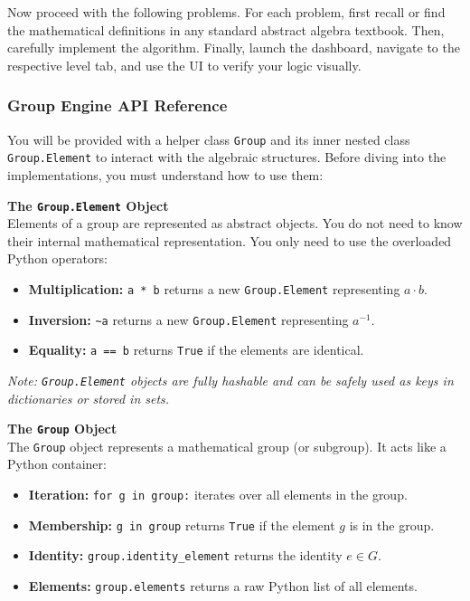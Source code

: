 \documentclass[11pt]{article}
\begin{document}
\vspace{0.5cm}
\noindent Now proceed with the following problems. For each problem, first recall or find the mathematical definitions in any standard abstract algebra textbook. Then, carefully implement the algorithm. Finally, launch the dashboard, navigate to the respective level tab, and use the UI to verify your logic visually.

\subsubsection*{Group Engine API Reference}
You will be provided with a helper class \lstinline|Group| and its inner nested class \lstinline|Group.Element| to interact with the algebraic structures. Before diving into the implementations, you must understand how to use them:

\textbf{The \lstinline|Group.Element| Object}\\
Elements of a group are represented as abstract objects. You do not need to know their internal mathematical representation. You only need to use the overloaded Python operators:
\begin{itemize}
    \item \textbf{Multiplication:} \lstinline|a * b| returns a new \lstinline|Group.Element| representing $a \cdot b$.
    \item \textbf{Inversion:} \lstinline|~a| returns a new \lstinline|Group.Element| representing $a^{-1}$.
    \item \textbf{Equality:} \lstinline|a == b| returns \lstinline|True| if the elements are identical.
\end{itemize}
\textit{Note: \lstinline|Group.Element| objects are fully hashable and can be safely used as keys in dictionaries or stored in sets.}

\textbf{The \lstinline|Group| Object}\\
The \lstinline|Group| object represents a mathematical group (or subgroup). It acts like a Python container:
\begin{itemize}
    \item \textbf{Iteration:} \lstinline|for g in group:| iterates over all elements in the group.
    \item \textbf{Membership:} \lstinline|g in group| returns \lstinline|True| if the element $g$ is in the group.
    \item \textbf{Identity:} \lstinline|group.identity_element| returns the identity $e \in G$.
    \item \textbf{Elements:} \lstinline|group.elements| returns a raw Python list of all elements.
\end{itemize}
\end{document}
